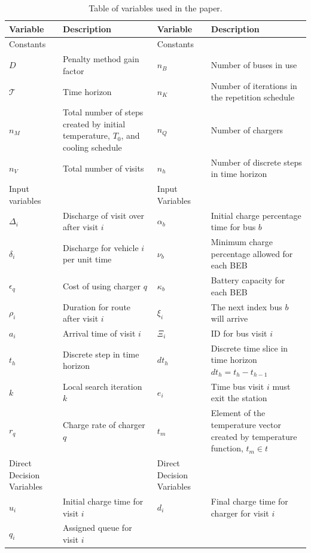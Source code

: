 \documentclass[11pt,a4paper,final]{article}
\newcommand{\T}{\mathcal{T}}                %
\newcommand{\Tau}{T}                        %
\begin{document}
\begin{table}[htbp]
\caption{\label{tab:variables}Table of variables used in the paper.}
\centering
\begin{tabularx}{\textwidth}{L{0.3} L{1.2} L{0.3} L{1.2}}
\textbf{Variable} & \textbf{Description} & \textbf{Variable} & \textbf{Description}\\[0pt]
\hline
Constants &  & Constants & \\[0pt]
\(D\) & Penalty method gain factor & \(n_B\) & Number of buses in use\\[0pt]
\(\T\) & Time horizon & \(n_K\) & Number of iterations in the repetition schedule\\[0pt]
\(n_M\) & Total number of steps created by initial temperature, \(\Tau_0\), and cooling schedule & \(n_Q\) & Number of chargers\\[0pt]
\(n_V\) & Total number of visits & \(n_h\) & Number of discrete steps in time horizon\\[0pt]
\hline
Input variables &  & Input Variables & \\[0pt]
\(\Delta_i\) & Discharge of visit over after visit \(i\) & \(\alpha_b\) & Initial charge percentage time for bus \(b\)\\[0pt]
\(\delta_i\) & Discharge for vehicle \(i\) per unit time & \(\nu_b\) & Minimum charge percentage allowed for each BEB\\[0pt]
\(\epsilon_q\) & Cost of using charger \(q\) & \(\kappa_b\) & Battery capacity for each BEB\\[0pt]
\(\rho_i\) & Duration for route after visit \(i\) & \(\xi_i\) & The next index bus \(b\) will arrive\\[0pt]
\(a_i\) & Arrival time of visit \(i\) & \(\Xi_i\) & ID for bus visit \(i\)\\[0pt]
\(t_h\) & Discrete step in time horizon & \(dt_h\) & Discrete time slice in time horizon \(dt_h = t_h - t_{h-1}\)\\[0pt]
\(k\) & Local search iteration \(k\) & \(e_i\) & Time bus visit \(i\) must exit the station\\[0pt]
\(r_q\) & Charge rate of charger \(q\) & \(t_m\) & Element of the temperature vector created by temperature function, \(t_m \in t\)\\[0pt]
\hline
Direct Decision Variables &  & Direct Decision Variables & \\[0pt]
\(u_i\) & Initial charge time for visit \(i\) & \(d_i\) & Final charge time for charger for visit \(i\)\\[0pt]
\(q_i\) & Assigned queue for visit \(i\) &  & \\[0pt]

\end{tabularx}
\end{table}
\end{document}
